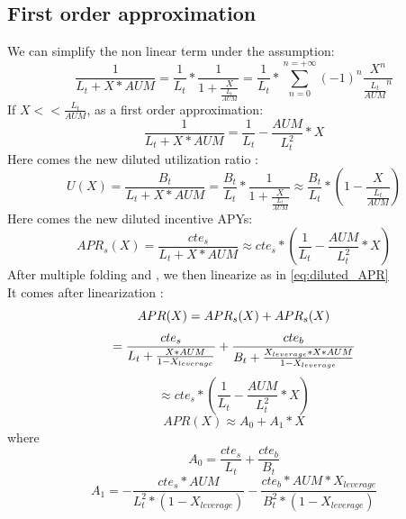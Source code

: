 \documentclass[conference]{IEEEtran}
\begin{document}
\subsection{First order approximation}
We can simplify the non linear term under the assumption: \\
$$
\frac{1}{L_t + X*AUM} = \frac{1}{L_t } *\frac{1}{1 + \frac{X}{\frac{L
_t}{AUM}}} = \frac{1}{L_t } * \sum_{n=0}^{n=+\infty}(-1)^n\frac{X^n}{\frac{L
_t}{AUM}^{n}}
$$
If $X<<\frac{L_t}{AUM}$, as a first order approximation:
$$
\frac{1}{L_t + X*AUM}  = \frac{1}{L_t }  - \frac{AUM}{L_t^2} * X 
$$
Here comes the new diluted utilization ratio :\\ 
\begin{equation}\label{eq:diluted_ratio}
U(X) = \frac{B_t}{L_t + X*AUM} = \frac{B_t}{L_t } *\frac{1}{1 + \frac{X}{\frac{L
_t}{AUM}}} \approx \frac{B_t}{L_t }*( 1 -\frac{X}{\frac{L
_t}{AUM}})
\end{equation}
Here comes the new diluted incentive APYs:\\ 
\begin{equation}\label{eq:diluted_APR}
APR_s(X) = \frac{cte_s}{L_t + X*AUM}  \approx  cte_s * ( \frac{1}{L_t }  - \frac{AUM}{L_t^2} * X )
\end{equation}
After multiple folding \label{eq:foldingSupply} and \label{eq:foldingBorrow}, we then linearize as in \ref{eq:diluted_APR}\\
It comes after linearization :\\
$$
APR(X) = APR_s(X) + APR_s(X)\\ 
$$
$$
= \frac{cte_s}{L_t + \frac{X*AUM}{1-X_{leverage}}}+ \frac{cte_b}{B_t + \frac{X_{leverage}*X*AUM}{1-X_{leverage}}}  \\
$$
$$
\approx  cte_s * ( \frac{1}{L_t}  - \frac{AUM}{L_t^2} * X )
$$
\begin{equation}\label{eq:linear_APR}
APR(X) \approx A_0 + A_1*X
\end{equation}
where 
\begin{equation}\label{eq:A_0}
A_0 = \frac{cte_s}{L_t} + \frac{cte_b}{B_t}
\end{equation}
\begin{equation}\label{eq:A_1}
A_1 = -\frac{cte_s*AUM}{L_t^2*(1-X_{leverage})} -\frac{cte_b*AUM*X_{leverage}}{B_t^2*(1-X_{leverage})}
\end{equation}
\end{document}
